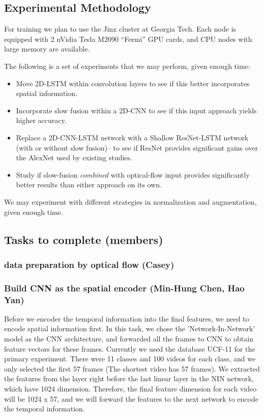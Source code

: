 \subsection*{Experimental Methodology}
For training we plan to use the Jinx cluster at Georgia Tech. Each node is equipped with 2 nVidia Tesla M2090 ``Fermi'' GPU cards, and CPU nodes with large memory are available.

The following is a set of experiments that we may perform, given enough time:
\begin{itemize}
\item Move 2D-LSTM within convolution layers to see if this better incorporates spatial information.
\item Incorporate slow fusion within a 2D-CNN to see if this input approach yields higher accuracy.
\item Replace a 2D-CNN-LSTM network with a Shallow ResNet-LSTM network (with or without slow fusion)-- to see if ResNet provides significant gains over the AlexNet used by existing studies.
\item Study if slow-fusion \emph{combined} with optical-flow input provides significantly better results than either approach on its own.
\end{itemize}
We may experiment with different strategies in normalization and augmentation, given enough time.

\subsection*{Tasks to complete (members)}

\subsubsection*{data preparation by optical flow (Casey)}

\subsubsection*{Build CNN as the spatial encoder (Min-Hung Chen, Hao Yan)}
Before we encoder the temporal information into the final features, we need to encode spatial information first. In this task, we chose the 'Network-In-Network'~\cite{nin} model as the CNN architecture, and forwarded all the frames to CNN to obtain feature vectors for these frames. Currently we used the database UCF-11 for the primary experiment. There were 11 classes and 100 videos for each class, and we only selected the first 57 frames (The shortest video has 57 frames). We extracted the features from the layer right before the last linear layer in the NIN network, which have 1024 dimension. Therefore, the final feature dimension for each video will be 1024 x 57, and we will forward the features to the next network to encode the temporal information.

